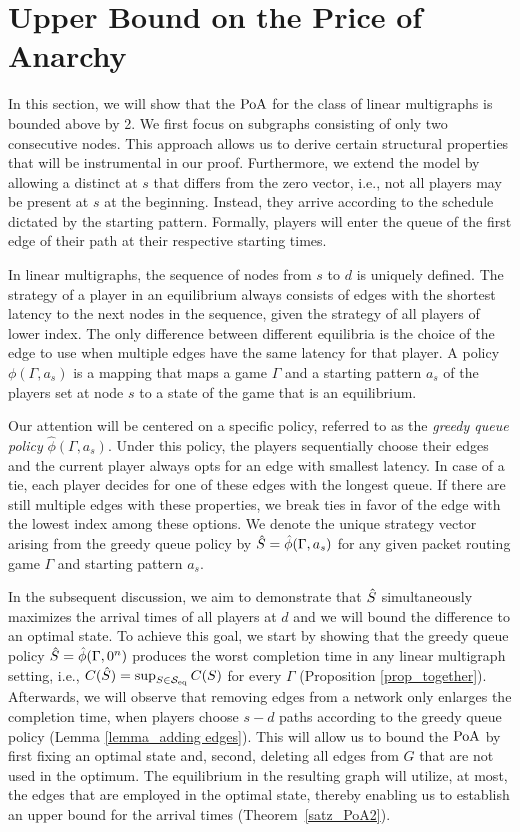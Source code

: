 \section{Upper Bound on the Price of Anarchy}\label{sec:poa}
In this section, we will show that the $\operatorname*{PoA}$ for the class of linear multigraphs is bounded above by 2.
We first focus on subgraphs consisting of only two consecutive nodes. This approach allows us to derive certain structural properties that will be instrumental in our proof. Furthermore, we extend the model by allowing a distinct at $s$ that differs from the zero vector, i.e., not all players may be present at $s$ at the beginning. Instead, they arrive according to the schedule dictated by the starting pattern. Formally, players will enter the queue of the first edge of their path at their respective starting times.

In linear multigraphs, the sequence of nodes from $s$ to $d$ is uniquely defined. The strategy of a player in an equilibrium always consists of edges with the shortest latency to the next nodes in the sequence, given the strategy of all players of lower index. The only difference between different equilibria is the choice of the edge to use when multiple edges have the same latency for that player. A policy $\phi(\Gamma,a_s)$ is a mapping that maps a game $\Gamma$ and a starting pattern $a_s$ of the players set at node $s$ to a state of the game that is an equilibrium. 

Our attention will be centered on a specific policy, referred to as the \emph{greedy queue policy} $\hat{\phi}(\Gamma,a_s)$. Under this policy, the players sequentially choose their edges and the current player always opts for an edge with smallest latency. In case of a tie, each player decides for one of these edges with the longest queue. If there are still multiple edges with these properties, we break ties in favor of the edge with the lowest index among these options. We denote the unique strategy vector arising from the greedy queue policy by $\hat{S}=\hat{\phi}(\Gamma,a_s)$ for any given packet routing game $\Gamma$ and starting pattern $a_s$. 

In the subsequent discussion, we aim to demonstrate that $\hat{S}$ simultaneously maximizes the arrival times of all players at $d$ and we will bound the difference to an optimal state. To achieve this goal, we start by showing that the greedy queue policy $\hat{S}=\hat{\phi}(\Gamma,0^n)$ produces the worst completion time in any linear multigraph setting, i.e., $C(\hat{S}) = \sup_{S \in \mathcal{S}_{\operatorname{eq}}} C(S)$ for every $\Gamma$ (Proposition \ref{prop_together}). Afterwards, we will observe that removing edges from a network only enlarges the completion time, when players choose $s-d$ paths according to the greedy queue policy (Lemma \ref{lemma_adding edges}).
This will allow us to bound the $\operatorname*{PoA}$ by first fixing an optimal state and, second, deleting all edges from $G$ that are not used in the optimum. The equilibrium in the resulting graph will utilize, at most, the edges that are employed in the optimal state, thereby enabling us to establish an upper bound for the arrival times (Theorem~\ref{satz_PoA2}).

